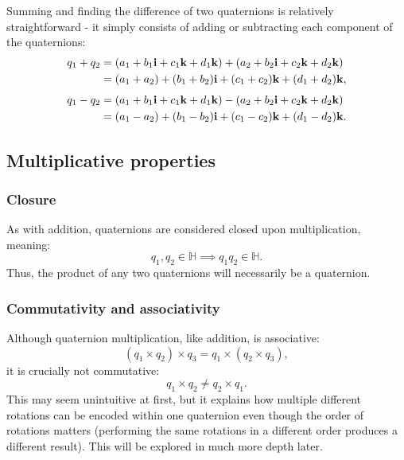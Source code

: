 \documentclass[10pt]{article}
\begin{document}
Summing and finding the difference of two quaternions is relatively straightforward - it simply consists of adding or subtracting each component of the quaternions: \cite{Illinois}
\begin{equation}
    \begin{aligned}
        q_1 + q_2 & = (a_1 + b_1\vb{i} + c_1\vb{k} + d_1\vb{k}) + (a_2 + b_2\vb{i} + c_2\vb{k} + d_2\vb{k}) \\
                  & = (a_1+a_2) + (b_1+b_2)\vb{i} + (c_1+c_2)\vb{k} + (d_1+d_2)\vb{k},
    \end{aligned}
\end{equation}
\begin{equation}
    \begin{aligned}
        q_1 - q_2 & = (a_1 + b_1\vb{i} + c_1\vb{k} + d_1\vb{k}) - (a_2 + b_2\vb{i} + c_2\vb{k} + d_2\vb{k}) \\
                  & = (a_1-a_2) + (b_1-b_2)\vb{i} + (c_1-c_2)\vb{k} + (d_1-d_2)\vb{k}.
    \end{aligned}
\end{equation}

\subsection{Multiplicative properties}

\subsubsection{Closure}

As with addition, quaternions are considered closed upon multiplication, meaning:
\begin{equation}
    q_1, q_2 \in \mathbb{H} \implies q_1q_2 \in \mathbb{H}.
\end{equation}
Thus, the product of any two quaternions will necessarily be a quaternion. \cite{Illinois}

\subsubsection{Commutativity and associativity} \label{ComAss}

Although quaternion multiplication, like addition, is associative: \cite{Illinois}
\begin{equation}
    (q_1 \times q_2) \times q_3 = q_1 \times (q_2 \times q_3),
\end{equation}
it is crucially not commutative: \cite{Math431}
\begin{equation}
    q_1 \times q_2 \neq q_2 \times q_1.
\end{equation}
This may seem unintuitive at first, but it explains how multiple different rotations can be encoded within one quaternion even though the order of rotations matters (performing the same rotations in a different order produces a different result). This will be explored in much more depth later.
\end{document}
